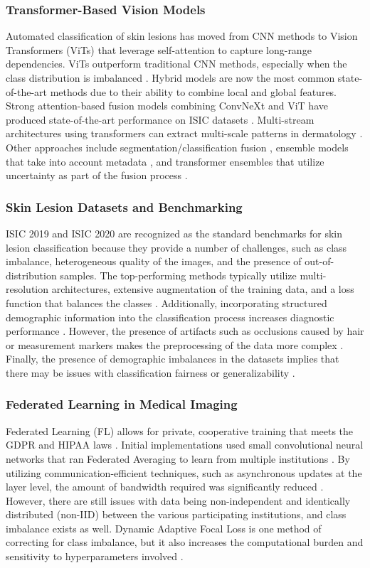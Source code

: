 \documentclass{ieeeaccess}
\begin{document}
\subsubsection{Transformer-Based Vision Models}
Automated classification of skin lesions has moved from CNN methods to Vision Transformers (ViTs) that leverage self-attention to capture long-range dependencies. ViTs outperform traditional CNN methods, especially when the class distribution is imbalanced \cite{Aguirre2024}. Hybrid models are now the most common state-of-the-art methods due to their ability to combine local and global features. Strong attention-based fusion models combining ConvNeXt and ViT have produced state-of-the-art performance on ISIC datasets \cite{Naeem2025}. Multi-stream architectures using transformers can extract multi-scale patterns in dermatology \cite{Alshdaifat2025}. Other approaches include segmentation/classification fusion \cite{HyperFusionNet2025}, ensemble models that take into account metadata \cite{HasanRifat2024}, and transformer ensembles that utilize uncertainty as part of the fusion process \cite{Zoravar2024}.
\subsubsection{Skin Lesion Datasets and Benchmarking}
ISIC 2019 and ISIC 2020 are recognized as the standard benchmarks for skin lesion classification because they provide a number of challenges, such as class imbalance, heterogeneous quality of the images, and the presence of out-of-distribution samples. The top-performing methods typically utilize multi-resolution architectures, extensive augmentation of the training data, and a loss function that balances the classes \cite{Gessert2020}. Additionally, incorporating structured demographic information into the classification process increases diagnostic performance \cite{Nunnari2020}. However, the presence of artifacts such as occlusions caused by hair or measurement markers makes the preprocessing of the data more complex \cite{Wegley2026}. Finally, the presence of demographic imbalances in the datasets implies that there may be issues with classification fairness or generalizability \cite{SkinDiversity2024}.
\subsubsection{Federated Learning in Medical Imaging}
Federated Learning (FL) allows for private, cooperative training that meets the GDPR and HIPAA laws \cite{Guan2024}. Initial implementations used small convolutional neural networks that ran Federated Averaging to learn from multiple institutions \cite{Subramanian2025}. By utilizing communication-efficient techniques, such as asynchronous updates at the layer level, the amount of bandwidth required was significantly reduced \cite{Yaqoob2023}. However, there are still issues with data being non-independent and identically distributed (non-IID) between the various participating institutions, and class imbalance exists as well. Dynamic Adaptive Focal Loss is one method of correcting for class imbalance, but it also increases the computational burden and sensitivity to hyperparameters involved \cite{Zhao2025}.
\end{document}
